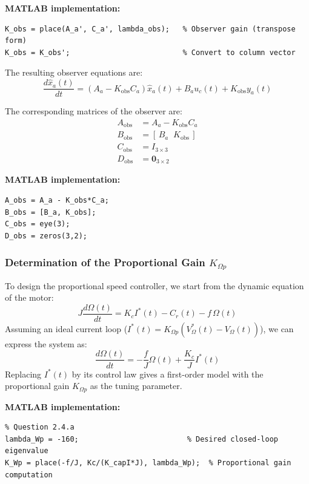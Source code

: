 \documentclass{rapportCS}
\begin{document}
\noindent\textbf{MATLAB implementation:}
\begin{verbatim}
K_obs = place(A_a', C_a', lambda_obs);   % Observer gain (transpose form)
K_obs = K_obs';                          % Convert to column vector
\end{verbatim}

The resulting observer equations are:
\begin{equation*}
\frac{d\hat{x}_a(t)}{dt}
= (A_a - K_{\mathrm{obs}} C_a)\hat{x}_a(t)
+ B_a u_c(t)
+ K_{\mathrm{obs}} y_a(t)
\end{equation*}

The corresponding matrices of the observer are:
\begin{align*}
A_{\mathrm{obs}} &= A_a - K_{\mathrm{obs}} C_a \\[4pt]
B_{\mathrm{obs}} &= [\,B_a \;\; K_{\mathrm{obs}}\,] \\[4pt]
C_{\mathrm{obs}} &= I_{3\times3} \\[4pt]
D_{\mathrm{obs}} &= \mathbf{0}_{3\times2}
\end{align*}

\noindent\textbf{MATLAB implementation:}
\begin{verbatim}
A_obs = A_a - K_obs*C_a;
B_obs = [B_a, K_obs];
C_obs = eye(3);
D_obs = zeros(3,2);
\end{verbatim}


\subsubsection{Determination of the Proportional Gain $K_{\Omega p}$}

To design the proportional speed controller, we start from the dynamic equation of the motor:
\begin{equation*}
J\frac{d\Omega(t)}{dt} = K_c I^*(t) - C_r(t) - f\,\Omega(t)
\end{equation*}
Assuming an ideal current loop ($I^*(t) = K_{\Omega p}(V_{\Omega}^*(t) - V_{\Omega}(t))$), we can express the system as:
\begin{equation*}
\frac{d\Omega(t)}{dt} = -\frac{f}{J}\Omega(t) + \frac{K_c}{J} I^*(t)
\end{equation*}
Replacing $I^*(t)$ by its control law gives a first-order model with the proportional gain $K_{\Omega p}$ as the tuning parameter.

\noindent\textbf{MATLAB implementation:}
\begin{verbatim}
% Question 2.4.a
lambda_Wp = -160;                         % Desired closed-loop eigenvalue
K_Wp = place(-f/J, Kc/(K_capI*J), lambda_Wp);  % Proportional gain computation
\end{verbatim}
\end{document}

